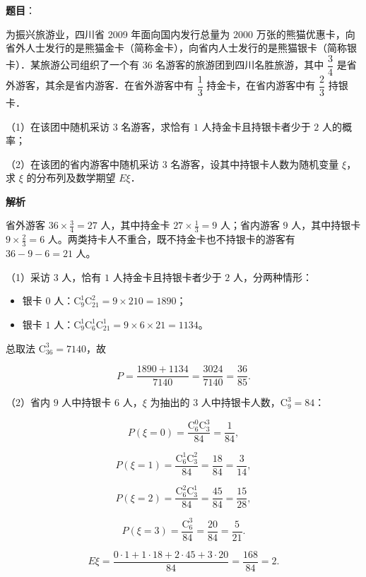 \begin{answer}

\textbf{题目}：

为振兴旅游业，四川省 2009 年面向国内发行总量为 $2000$ 万张的熊猫优惠卡，向省外人士发行的是熊猫金卡（简称金卡），向省内人士发行的是熊猫银卡（简称银卡）．某旅游公司组织了一个有 $36$ 名游客的旅游团到四川名胜旅游，其中 $\dfrac34$ 是省外游客，其余是省内游客．在省外游客中有 $\dfrac13$ 持金卡，在省内游客中有 $\dfrac23$ 持银卡．

（1）在该团中随机采访 $3$ 名游客，求恰有 $1$ 人持金卡且持银卡者少于 $2$ 人的概率；

（2）在该团的省内游客中随机采访 $3$ 名游客，设其中持银卡人数为随机变量 $\xi$，求 $\xi$ 的分布列及数学期望 $E\xi$．

\textbf{解析}

省外游客 $36\times\frac34=27$ 人，其中持金卡 $27\times\frac13=9$ 人；省内游客 $9$ 人，其中持银卡 $9\times\frac23=6$ 人。两类持卡人不重合，既不持金卡也不持银卡的游客有 $36-9-6=21$ 人。

（1）采访 $3$ 人，恰有 $1$ 人持金卡且持银卡者少于 $2$ 人，分两种情形：

\begin{itemize}
\item 银卡 $0$ 人：$\mathrm C_9^1\mathrm C_{21}^2=9\times210=1890$；
\item 银卡 $1$ 人：$\mathrm C_9^1\mathrm C_6^1\mathrm C_{21}^1=9\times6\times21=1134$。
\end{itemize}

总取法 $\mathrm C_{36}^3=7140$，故

\nopagebreak[4]
\[P=\frac{1890+1134}{7140}=\frac{3024}{7140}=\frac{36}{85} .\]

（2）省内 $9$ 人中持银卡 $6$ 人，$\xi$ 为抽出的 $3$ 人中持银卡人数，$\mathrm C_9^3=84$：

\nopagebreak[4]
\[P(\xi=0)=\frac{\mathrm C_6^0\mathrm C_3^3}{84}=\frac1{84},\]

\nopagebreak[4]
\[P(\xi=1)=\frac{\mathrm C_6^1\mathrm C_3^2}{84}=\frac{18}{84}=\frac3{14},\]

\nopagebreak[4]
\[P(\xi=2)=\frac{\mathrm C_6^2\mathrm C_3^1}{84}=\frac{45}{84}=\frac{15}{28},\]

\nopagebreak[4]
\[P(\xi=3)=\frac{\mathrm C_6^3}{84}=\frac{20}{84}=\frac5{21}.\]

\nopagebreak[4]
\[E\xi=\frac{0\cdot1+1\cdot18+2\cdot45+3\cdot20}{84}
=\frac{168}{84}=2 .\]


\end{answer}
